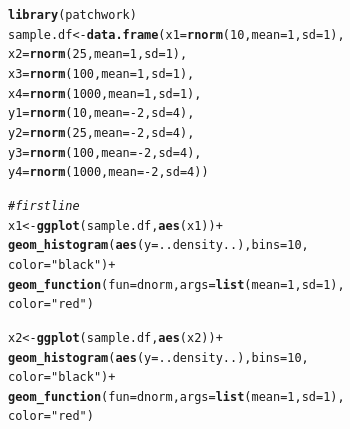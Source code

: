 \documentclass{article}\usepackage[]{graphicx}\usepackage[]{color}
\makeatletter
\newcommand{\hlnum}[1]{\textcolor[rgb]{0.686,0.059,0.569}{#1}}%
\newcommand{\hlstr}[1]{\textcolor[rgb]{0.192,0.494,0.8}{#1}}%
\newcommand{\hlcom}[1]{\textcolor[rgb]{0.678,0.584,0.686}{\textit{#1}}}%
\newcommand{\hlopt}[1]{\textcolor[rgb]{0,0,0}{#1}}%
\newcommand{\hlstd}[1]{\textcolor[rgb]{0.345,0.345,0.345}{#1}}%
\newcommand{\hlkwb}[1]{\textcolor[rgb]{0.69,0.353,0.396}{#1}}%
\newcommand{\hlkwc}[1]{\textcolor[rgb]{0.333,0.667,0.333}{#1}}%
\newcommand{\hlkwd}[1]{\textcolor[rgb]{0.737,0.353,0.396}{\textbf{#1}}}%
\newenvironment{kframe}{%
 \def\at@end@of@kframe{}%
 \ifinner\ifhmode%
  \def\at@end@of@kframe{\end{minipage}}%
  \begin{minipage}{\columnwidth}%
 \fi\fi%
 \def\FrameCommand##1{\hskip\@totalleftmargin \hskip-\fboxsep
 \colorbox{shadecolor}{##1}\hskip-\fboxsep
     \hskip-\linewidth \hskip-\@totalleftmargin \hskip\columnwidth}%
 \MakeFramed {\advance\hsize-\width
   \@totalleftmargin\z@ \linewidth\hsize
   \@setminipage}}%
 {\par\unskip\endMakeFramed%
 \at@end@of@kframe}
\newenvironment{knitrout}{}{} %
\makeatother
\begin{document}
\begin{enumerate}
\begin{enumerate}
\begin{knitrout}
\color{fgcolor}\begin{kframe}
\begin{alltt}
        \hlkwd{library}\hlstd{(patchwork)}
        \hlstd{sample.df} \hlkwb{<-} \hlkwd{data.frame}\hlstd{(}\hlkwc{x1}\hlstd{=}\hlkwd{rnorm}\hlstd{(}\hlnum{10}\hlstd{,} \hlkwc{mean}\hlstd{=}\hlnum{1}\hlstd{,} \hlkwc{sd}\hlstd{=}\hlnum{1}\hlstd{),}
                               \hlkwc{x2}\hlstd{=}\hlkwd{rnorm}\hlstd{(}\hlnum{25}\hlstd{,} \hlkwc{mean}\hlstd{=}\hlnum{1}\hlstd{,} \hlkwc{sd}\hlstd{=}\hlnum{1}\hlstd{),}
                               \hlkwc{x3}\hlstd{=}\hlkwd{rnorm}\hlstd{(}\hlnum{100}\hlstd{,} \hlkwc{mean}\hlstd{=}\hlnum{1}\hlstd{,} \hlkwc{sd}\hlstd{=}\hlnum{1}\hlstd{),}
                               \hlkwc{x4}\hlstd{=}\hlkwd{rnorm}\hlstd{(}\hlnum{1000}\hlstd{,} \hlkwc{mean}\hlstd{=}\hlnum{1}\hlstd{,} \hlkwc{sd}\hlstd{=}\hlnum{1}\hlstd{),}
                               \hlkwc{y1}\hlstd{=}\hlkwd{rnorm}\hlstd{(}\hlnum{10}\hlstd{,} \hlkwc{mean}\hlstd{=}\hlopt{-}\hlnum{2}\hlstd{,} \hlkwc{sd}\hlstd{=}\hlnum{4}\hlstd{),}
                               \hlkwc{y2}\hlstd{=}\hlkwd{rnorm}\hlstd{(}\hlnum{25}\hlstd{,} \hlkwc{mean}\hlstd{=}\hlopt{-}\hlnum{2}\hlstd{,} \hlkwc{sd}\hlstd{=}\hlnum{4}\hlstd{),}
                               \hlkwc{y3}\hlstd{=}\hlkwd{rnorm}\hlstd{(}\hlnum{100}\hlstd{,} \hlkwc{mean}\hlstd{=}\hlopt{-}\hlnum{2}\hlstd{,} \hlkwc{sd}\hlstd{=}\hlnum{4}\hlstd{),}
                               \hlkwc{y4}\hlstd{=}\hlkwd{rnorm}\hlstd{(}\hlnum{1000}\hlstd{,} \hlkwc{mean}\hlstd{=}\hlopt{-}\hlnum{2}\hlstd{,} \hlkwc{sd}\hlstd{=}\hlnum{4}\hlstd{))}

        \hlcom{#first line}
        \hlstd{x1}\hlkwb{<-}\hlkwd{ggplot}\hlstd{(sample.df,} \hlkwd{aes}\hlstd{(x1))}\hlopt{+}
          \hlkwd{geom_histogram}\hlstd{(}\hlkwd{aes}\hlstd{(}\hlkwc{y}\hlstd{=..density..),} \hlkwc{bins}\hlstd{=}\hlnum{10}\hlstd{,}
                         \hlkwc{color}\hlstd{=}\hlstr{"black"}\hlstd{)}\hlopt{+}
\hlkwd{geom_function}\hlstd{(}\hlkwc{fun}\hlstd{=dnorm,} \hlkwc{args} \hlstd{=} \hlkwd{list}\hlstd{(}\hlkwc{mean} \hlstd{=} \hlnum{1}\hlstd{,} \hlkwc{sd} \hlstd{=} \hlnum{1}\hlstd{),}
              \hlkwc{color}\hlstd{=}\hlstr{"red"}\hlstd{)}

        \hlstd{x2}\hlkwb{<-}\hlkwd{ggplot}\hlstd{(sample.df,} \hlkwd{aes}\hlstd{(x2))}\hlopt{+}
          \hlkwd{geom_histogram}\hlstd{(}\hlkwd{aes}\hlstd{(}\hlkwc{y}\hlstd{=..density..),} \hlkwc{bins}\hlstd{=}\hlnum{10}\hlstd{,}
                         \hlkwc{color}\hlstd{=}\hlstr{"black"}\hlstd{)}\hlopt{+}
\hlkwd{geom_function}\hlstd{(}\hlkwc{fun}\hlstd{=dnorm,} \hlkwc{args} \hlstd{=} \hlkwd{list}\hlstd{(}\hlkwc{mean} \hlstd{=} \hlnum{1}\hlstd{,} \hlkwc{sd} \hlstd{=} \hlnum{1}\hlstd{),}
              \hlkwc{color}\hlstd{=}\hlstr{"red"}\hlstd{)}


\end{alltt}
\end{kframe}
\end{knitrout}
\end{enumerate}
\end{enumerate}
\end{document}
